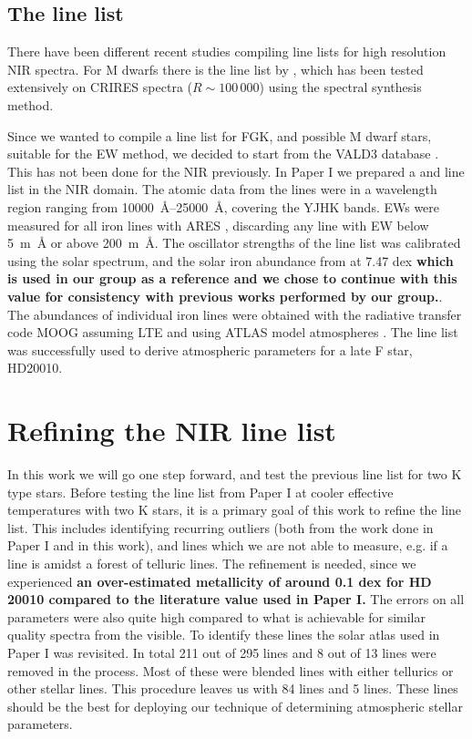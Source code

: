 \documentclass{aa}
\begin{document}
\subsection{The line list}

There have been different recent studies compiling line lists for high resolution NIR spectra. For M
dwarfs there is the line list by \citet{Onehag2012,Lindgren2016}, which has been tested extensively
on CRIRES spectra ($R\sim100\,000$) using the spectral synthesis method.

Since we wanted to compile a line list for FGK, and possible M dwarf stars, suitable for the EW
method, we decided to start from the VALD3 database \citep{VALD1,VALD2}. This has not been done for
the NIR previously. In Paper I we prepared a  and  line list in the NIR
domain. The atomic data from the lines were in a wavelength region ranging from
\SIrange{10000}{25000}{\AA}, covering the YJHK bands. EWs were measured for all iron lines with ARES
\citep{Sousa2015a}, discarding any line with EW below \SI{5}{m\AA} or above \SI{200}{m\AA}. The
oscillator strengths of the line list was calibrated using the solar spectrum, and the solar iron
abundance from \citet{Gonzalez2000} at 7.47 dex {\bf which is used in our group as a reference and
we chose to continue with this value for consistency with previous works performed by our group.}.
The abundances of individual iron lines were obtained with the radiative transfer code MOOG
\citep{Sneden1973} assuming LTE and using ATLAS model atmospheres \citep{Kurucz1993}. The line list
was successfully used to derive atmospheric parameters for a late F star, HD20010.


\section{Refining the NIR line list}
\label{sec:refining_the_line_list}

In this work we will go one step forward, and test the previous line list for two K type stars.
Before testing the line list from Paper I at cooler effective temperatures with two K stars, it is a
primary goal of this work to refine the line list. This includes identifying recurring outliers
(both from the work done in Paper I and in this work), and lines which we are not able to measure,
e.g. if a line is amidst a forest of telluric lines. The refinement is needed, since we experienced
{\bf an over-estimated metallicity of around 0.1 dex for HD 20010 compared to the literature value
used in Paper I.} The errors on all parameters were also quite high compared to what is achievable
for similar quality spectra from the visible. To identify these lines the solar atlas used in Paper
I was revisited. In total 211 out of 295  lines and 8 out of 13  lines were
removed in the process. Most of these were blended lines with either tellurics or other stellar
lines. This procedure leaves us with 84  lines and 5  lines. These lines
should be the best for deploying our technique of determining atmospheric stellar parameters.
\end{document}
